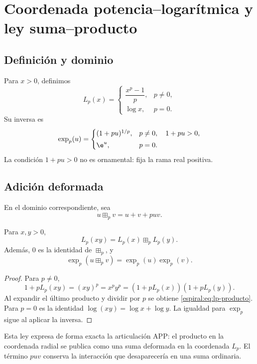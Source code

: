 \chapter{Coordenada potencia--logarítmica y ley suma--producto}

\section{Definición y dominio}

Para \(x>0\), definimos
\begin{equation}
 L_p(x)=
 \begin{cases}
 \dfrac{x^p-1}{p},&p\neq0,\\[2mm]
 \log x,&p=0.
 \end{cases}
 \label{espiral:eq:lp-def}
\end{equation}
Su inversa es
\begin{equation}
 \exp_p(u)=
 \begin{cases}
 (1+pu)^{1/p},&p\neq0,\quad1+pu>0,\\[1mm]
 \e^u,&p=0.
 \end{cases}
 \label{espiral:eq:exp-p}
\end{equation}
La condición \(1+pu>0\) no es ornamental: fija la rama real positiva.

\section{Adición deformada}

En el dominio correspondiente, sea
\[
 u\boxplus_pv=u+v+puv.
\]

\begin{theorem}
Para \(x,y>0\),
\begin{equation}
 L_p(xy)=L_p(x)\boxplus_pL_p(y).
 \label{espiral:eq:lp-producto}
\end{equation}
Además, \(0\) es la identidad de \(\boxplus_p\), y
\[
 \exp_p(u\boxplus_pv)=\exp_p(u)\exp_p(v).
\]
\end{theorem}
\begin{proof}
Para \(p\neq0\),
\[
 1+pL_p(xy)=(xy)^p=x^py^p
 =(1+pL_p(x))(1+pL_p(y)).
\]
Al expandir el último producto y dividir por \(p\) se obtiene
\cref{espiral:eq:lp-producto}. Para \(p=0\) es la identidad
\(\log(xy)=\log x+\log y\). La igualdad para \(\exp_p\) sigue al aplicar
la inversa.
\end{proof}

Esta ley expresa de forma exacta la articulación APP: el producto en la
coordenada radial se publica como una suma deformada en la coordenada
\(L_p\). El término \(puv\) conserva la interacción que desaparecería en
una suma ordinaria.


